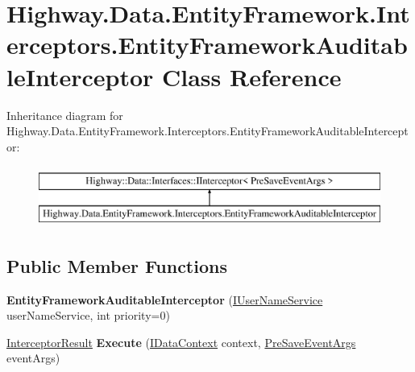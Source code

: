\hypertarget{class_highway_1_1_data_1_1_entity_framework_1_1_interceptors_1_1_entity_framework_auditable_interceptor}{\section{Highway.\-Data.\-Entity\-Framework.\-Interceptors.\-Entity\-Framework\-Auditable\-Interceptor Class Reference}
\label{class_highway_1_1_data_1_1_entity_framework_1_1_interceptors_1_1_entity_framework_auditable_interceptor}
}
Inheritance diagram for Highway.\-Data.\-Entity\-Framework.\-Interceptors.\-Entity\-Framework\-Auditable\-Interceptor\-:\begin{figure}[H]
\begin{center}
\leavevmode
\includegraphics[height=2.000000cm]{class_highway_1_1_data_1_1_entity_framework_1_1_interceptors_1_1_entity_framework_auditable_interceptor}
\end{center}
\end{figure}
\subsection*{Public Member Functions}
\begin{DoxyCompactItemize}
\item 
\hypertarget{class_highway_1_1_data_1_1_entity_framework_1_1_interceptors_1_1_entity_framework_auditable_interceptor_af82e7af9db91d333a1faf197398405f3}{{\bfseries Entity\-Framework\-Auditable\-Interceptor} (\hyperlink{interface_highway_1_1_data_1_1_interfaces_1_1_i_user_name_service}{I\-User\-Name\-Service} user\-Name\-Service, int priority=0)}\label{class_highway_1_1_data_1_1_entity_framework_1_1_interceptors_1_1_entity_framework_auditable_interceptor_af82e7af9db91d333a1faf197398405f3}

\item 
\hypertarget{class_highway_1_1_data_1_1_entity_framework_1_1_interceptors_1_1_entity_framework_auditable_interceptor_afb272779790d7da3d2006d94236b450e}{\hyperlink{struct_highway_1_1_data_1_1_interceptors_1_1_interceptor_result}{Interceptor\-Result} {\bfseries Execute} (\hyperlink{interface_highway_1_1_data_1_1_interfaces_1_1_i_data_context}{I\-Data\-Context} context, \hyperlink{class_highway_1_1_data_1_1_interceptors_1_1_events_1_1_pre_save_event_args}{Pre\-Save\-Event\-Args} event\-Args)}\label{class_highway_1_1_data_1_1_entity_framework_1_1_interceptors_1_1_entity_framework_auditable_interceptor_afb272779790d7da3d2006d94236b450e}

\end{DoxyCompactItemize}
